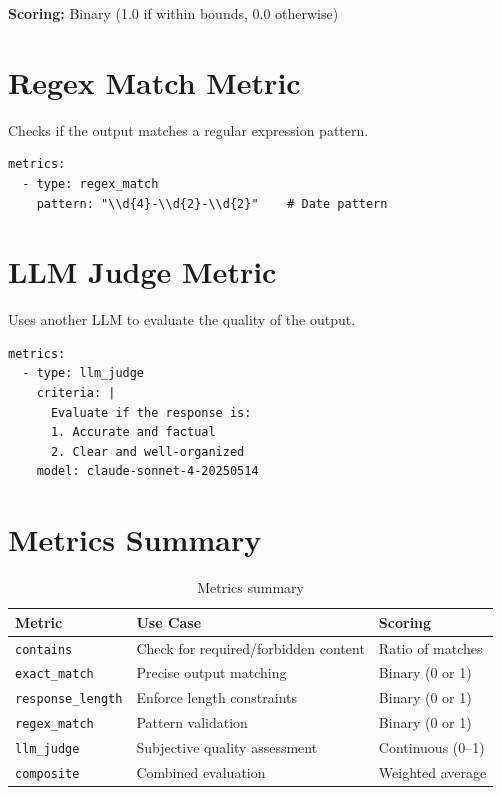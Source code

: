 \documentclass[11pt,a4paper]{report}
\begin{document}
\textbf{Scoring:} Binary (1.0 if within bounds, 0.0 otherwise)

\section{Regex Match Metric}

Checks if the output matches a regular expression pattern.

\begin{lstlisting}[style=yaml]
metrics:
  - type: regex_match
    pattern: "\\d{4}-\\d{2}-\\d{2}"    # Date pattern
\end{lstlisting}

\section{LLM Judge Metric}

Uses another LLM to evaluate the quality of the output.

\begin{lstlisting}[style=yaml]
metrics:
  - type: llm_judge
    criteria: |
      Evaluate if the response is:
      1. Accurate and factual
      2. Clear and well-organized
    model: claude-sonnet-4-20250514
\end{lstlisting}

\section{Metrics Summary}

\begin{table}[h]
\centering
\begin{tabular}{@{}lp{5cm}l@{}}
\toprule
\textbf{Metric} & \textbf{Use Case} & \textbf{Scoring} \\
\midrule
\texttt{contains} & Check for required/forbidden content & Ratio of matches \\
\texttt{exact\_match} & Precise output matching & Binary (0 or 1) \\
\texttt{response\_length} & Enforce length constraints & Binary (0 or 1) \\
\texttt{regex\_match} & Pattern validation & Binary (0 or 1) \\
\texttt{llm\_judge} & Subjective quality assessment & Continuous (0--1) \\
\texttt{composite} & Combined evaluation & Weighted average \\
\bottomrule
\end{tabular}
\caption{Metrics summary}
\end{table}
\end{document}
